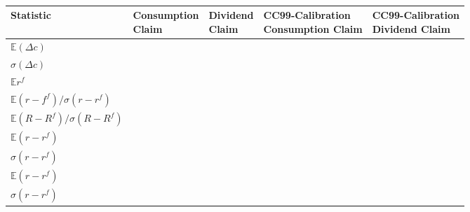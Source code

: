\begin{table}[]
\centering
\caption{}
\label{tab:my-table}
\begin{tabular}{@{}lllll@{}}
\toprule
Statistic                                               & \makecell{Consumption \\ Claim} & \makecell{Dividend \\ Claim} & \makecell{CC99-Calibration \\ Consumption Claim} & \makecell{CC99-Calibration\\ Dividend Claim} \\ \midrule
$\mathbb{E}\left(\Delta c \right)$                      &                   &                &                                        &                                     \\
$\sigma\left(\Delta c \right)$                          &                   &                &                                        &                                     \\
$\mathbb{E}r^f$                                         &                   &                &                                        &                                     \\
$\mathbb{E}\left(r-f^f\right)/\sigma\left(r-r^f\right)$ &                   &                &                                        &                                     \\
$\mathbb{E}\left(R-R^f\right)/\sigma\left(R-R^f\right)$ &                   &                &                                        &                                     \\
$\mathbb{E}\left(r-r^f\right)$                          &                   &                &                                        &                                     \\
$\sigma\left(r-r^f\right)$                              &                   &                &                                        &                                     \\ 
$\mathbb{E}\left(r-r^f\right)$                          &                   &                &                                        &                                     \\
$\sigma\left(r-r^f\right)$                              &                   &                &                                        &                                     \\ \bottomrule
\end{tabular}
\end{table}


